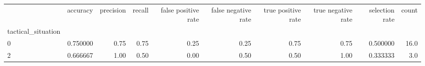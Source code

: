 \begin{tabular}{lrrrrrrrrr}
\toprule
{} &  accuracy &  precision &  recall &  false positive rate &  false negative rate &  true positive rate &  true negative rate &  selection rate &  count \\
tactical\_situation &           &            &         &                      &                      &                     &                     &                 &        \\
\midrule
0                  &  0.750000 &       0.75 &    0.75 &                 0.25 &                 0.25 &                0.75 &                0.75 &        0.500000 &   16.0 \\
2                  &  0.666667 &       1.00 &    0.50 &                 0.00 &                 0.50 &                0.50 &                1.00 &        0.333333 &    3.0 \\
\bottomrule
\end{tabular}
